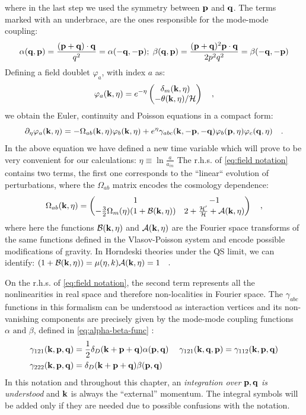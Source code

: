 where in the last step we used the symmetry between $\mathbf{p}$ and $\mathbf{q}$.
The terms marked with an underbrace, are the ones responsible for
the mode-mode coupling:
\begin{equation}
\alpha(\mathbf{q},\mathbf{p})=\frac{(\mathbf{p}+\mathbf{q})\cdot\mathbf{q}}{q^{2}}=\alpha(-\mathbf{q},-\mathbf{p});\;\beta(\mathbf{q},\mathbf{p})=\frac{(\mathbf{p}+\mathbf{q})^{2}\mathbf{p}\cdot\mathbf{q}}{2p^{2}q^{2}}=\beta(-\mathbf{q},-\mathbf{p})\label{eq:alpha-beta-func}
\end{equation}
Defining a field doublet $\varphi_a$, with index $a$ as: 
\begin{equation}
\varphi_{a}(\mathbf{k},\eta)=e^{-\eta}\begin{pmatrix}\delta_{m}(\mathbf{k},\eta)\\ -\theta(\mathbf{k},\eta)/\mathcal{H} \end{pmatrix} \quad,\label{eq:field-doublet}
\end{equation}
we obtain the Euler, continuity and Poisson equations in a compact form:
\begin{equation}\label{eq:field notation}
\partial_{\eta}\varphi_{a}(\mathbf{k},\eta)=-\Omega_{ab}(\mathbf{k},\eta)\varphi_{b}(\mathbf{k},\eta)+e^{\eta}\gamma_{abc}(\mathbf{k},\mathbf{-p},\mathbf{-q})\varphi_{b}(\mathbf{p},\eta)\varphi_{c}(\mathbf{q},\eta) \quad.
\end{equation}
In the above equation we have defined a new time variable which will prove to be very convenient for our calculations:
\beeqp$ 
\eta\equiv\ln\frac{a}{a_{in}}
$
The r.h.s. of  \cref{eq:field notation} contains two terms, the first one
corresponds to the ``linear`` evolution of perturbations, where the $\Omega_{ab}$
matrix encodes the cosmology dependence:
\begin{equation}\label{eq:general-Omega-Matrix}
\Omega_{ab}(\mathbf{k},\eta)=\begin{pmatrix}1 & -1\\
-\frac{3}{2}\Omega_{m}(\eta)(1+\mathcal{B}(\mathbf{k},\eta)) & 2+\frac{\mathcal{H}'}{\mathcal{H}}+\mathcal{A}(\mathbf{k},\eta)
\end{pmatrix} \quad,
\end{equation}
where here the functions $\mathcal{B}(\mathbf{k},\eta)$ and $\mathcal{A}(\mathbf{k},\eta)$ are the Fourier space
transforms of the same functions defined in the Vlasov-Poisson system 
and encode possible modifications of gravity.
In Horndeski theories under the QS limit, we can identify:
\beeqal$
(1+\mathcal{B}(\mathbf{k},\eta)) = \mu(\eta,k) \\
\mathcal{A}(\mathbf{k},\eta) = 1 \quad.
$

On the r.h.s. of  \cref{eq:field notation}, the second term represents
all the nonlinearities in real space and therefore non-localities in Fourier space.
The $\gamma_{abc}$ functions
in this formalism can be understood as interaction vertices and its
non-vanishing components are precisely given by the mode-mode
coupling functions $\alpha \textrm{ and } \beta$, defined in \cref{eq:alpha-beta-func} : 
\begin{align}
\gamma_{121}(\mathbf{k},\mathbf{p},\mathbf{q}) & =\frac{1}{2}\delta_{D}(\mathbf{k}+\mathbf{p}+\mathbf{q})\alpha(\mathbf{p},\mathbf{q}) & \;\gamma_{121}(\mathbf{k},\mathbf{q},\mathbf{p})=\gamma_{112}(\mathbf{k},\mathbf{p},\mathbf{q})\label{eq:coupling-vertices}\\
\gamma_{222}(\mathbf{k},\mathbf{p},\mathbf{q}) & =\delta_{D}(\mathbf{k}+\mathbf{p}+\mathbf{q})\beta(\mathbf{p},\mathbf{q})\nonumber 
\end{align}
In this notation and throughout this chapter, an \emph{integration over} $\mathbf{p},\mathbf{q}$
\emph{is understood} and $\mathbf{k}$ is always the ``external'' momentum.
The integral symbols will be added only if they are needed due to possible confusions
with the notation.

